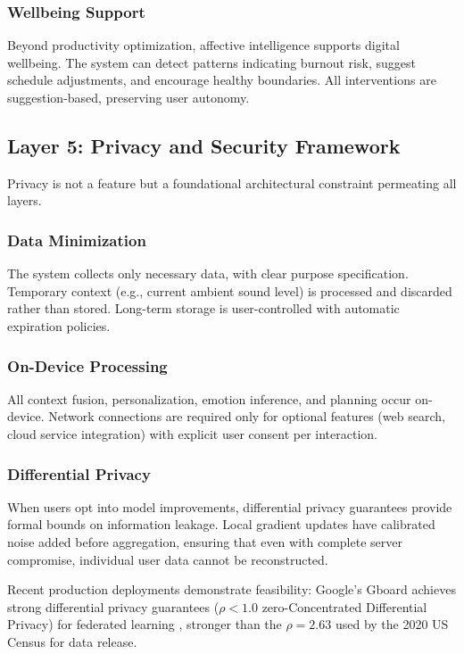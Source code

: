 \documentclass[conference]{IEEEtran}
\begin{document}
\subsubsection{Wellbeing Support}

Beyond productivity optimization, affective intelligence supports digital wellbeing. The system can detect patterns indicating burnout risk, suggest schedule adjustments, and encourage healthy boundaries. All interventions are suggestion-based, preserving user autonomy.

\subsection{Layer 5: Privacy and Security Framework}

Privacy is not a feature but a foundational architectural constraint permeating all layers.

\subsubsection{Data Minimization}

The system collects only necessary data, with clear purpose specification. Temporary context (e.g., current ambient sound level) is processed and discarded rather than stored. Long-term storage is user-controlled with automatic expiration policies.

\subsubsection{On-Device Processing}

All context fusion, personalization, emotion inference, and planning occur on-device. Network connections are required only for optional features (web search, cloud service integration) with explicit user consent per interaction.

\subsubsection{Differential Privacy}

When users opt into model improvements, differential privacy guarantees \cite{dwork2006differential} provide formal bounds on information leakage. Local gradient updates have calibrated noise added before aggregation, ensuring that even with complete server compromise, individual user data cannot be reconstructed.

Recent production deployments demonstrate feasibility: Google's Gboard achieves strong differential privacy guarantees ($\rho < 1.0$ zero-Concentrated Differential Privacy) for federated learning \cite{kairouz2021practical}, stronger than the $\rho = 2.63$ used by the 2020 US Census for data release.
\end{document}
